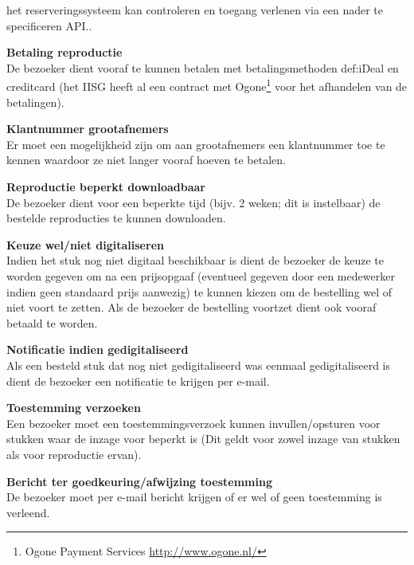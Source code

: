 \documentclass[a4paper,titlepage]{report}
\makeatletter
\def\nameddisplayedlabel#1#2{
  \label{#1}
  \begingroup
   \def\@currentlabel{#2}%
   \label{#1:name}\endgroup
   \textbf{#2}\hfill\\
}
\makeatother
\begin{document}
\begin{enumerate}[label={[F:\arabic*]}]
{              het reserveringssysteem kan controleren en toegang verlenen via
              een nader te specificeren API.}.
            \begin{enumerate}[label={[F:\arabic{enumi}\alph*]}]
              \item\nameddisplayedlabel{f:betaling_repro}{Betaling reproductie}
                De bezoeker dient vooraf te kunnen betalen met
                betalingsmethoden \gls{def:iDeal} en creditcard (het IISG heeft al een
                contract met Ogone\footnote{Ogone Payment Services
                \url{http://www.ogone.nl/}} voor het afhandelen van de
                betalingen).
             \item\nameddisplayedlabel{f:repro_klantnummer}{Klantnummer
             grootafnemers}
                Er moet een mogelijkheid zijn om aan grootafnemers een
                klantnummer toe te kennen waardoor ze niet langer vooraf
                hoeven te betalen.
             \item\nameddisplayedlabel{f:repro_beperkt}{Reproductie beperkt
                downloadbaar}
                De bezoeker dient voor een beperkte tijd (bijv. 2 weken; dit is
                instelbaar) de bestelde
                reproducties te kunnen downloaden.
              \item\nameddisplayedlabel{f:repro_digitaal_keus}{Keuze wel/niet
                digitaliseren}
                Indien het stuk nog niet digitaal beschikbaar is dient de
                bezoeker de keuze te worden gegeven om na een prijsopgaaf
                (eventueel gegeven door een medewerker indien geen standaard
                prijs aanwezig) te
                kunnen kiezen om de bestelling wel of niet voort te zetten.
                Als de bezoeker de bestelling voortzet dient ook vooraf
                betaald te worden.
              \item\nameddisplayedlabel{f:repro_bevestiging}{Notificatie indien
                gedigitaliseerd}
                Als een besteld stuk dat nog niet gedigitaliseerd was
                eenmaal gedigitaliseerd is dient de bezoeker
                een notificatie te krijgen per e-mail.
            \end{enumerate}
          \item\nameddisplayedlabel{f:permissie}{Toestemming verzoeken}
            Een bezoeker moet een toestemmingsverzoek kunnen invullen/opsturen
            voor stukken waar de inzage voor beperkt is
            (Dit geldt voor zowel inzage van stukken als voor reproductie
            ervan).
            \begin{enumerate}[label={[F:\arabic{enumi}\alph*]}]
              \item\nameddisplayedlabel{f:permissie_bevestiging}{Bericht ter
                goedkeuring/afwijzing toestemming}
                De bezoeker moet per e-mail bericht krijgen of er wel
                of geen toestemming is verleend.
            \end{enumerate}
      \end{enumerate}
\end{document}
